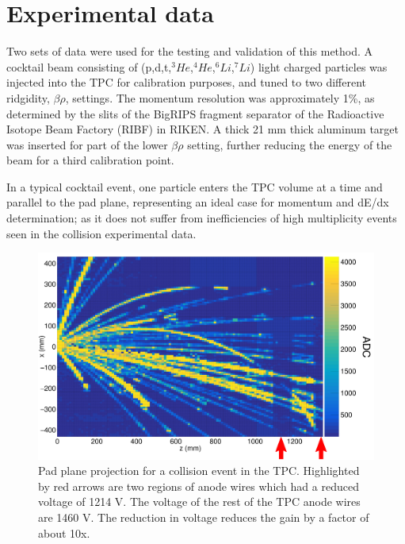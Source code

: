 \documentclass[review]{elsarticle}
\begin{document}
\section{Experimental data}
Two sets of data were used for the testing and validation of this method. A cocktail beam consisting of (p,d,t,${}^3He$,${}^4He$,${}^6Li$,${}^7Li$) light charged particles was injected into the TPC for calibration purposes, and tuned to two different ridgidity, $\beta\rho$, settings. The momentum resolution was approximately 1\%, as determined by the slits of the BigRIPS fragment separator of the Radioactive Isotope Beam Factory (RIBF) in RIKEN. A thick 21 mm thick aluminum target was inserted for part of the lower $\beta\rho$ setting, further reducing the energy of the beam for a third calibration point. 

In a typical cocktail event, one particle enters the TPC volume at a time and parallel to the pad plane, representing an ideal case for momentum and dE/dx determination; as it does not suffer from inefficiencies of high multiplicity events seen in the collision experimental data.  

\begin{figure}[H]
\includegraphics[width=\linewidth]{data.pdf}
\caption{Pad plane projection for a collision event in the TPC. Highlighted by red arrows are two regions of anode wires which had a reduced voltage of 1214 V. The voltage of the rest of the TPC anode wires are 1460 V. The reduction in voltage reduces the gain by a factor of about 10x. }
\label{fig:data}
\end{figure}
\end{document}
